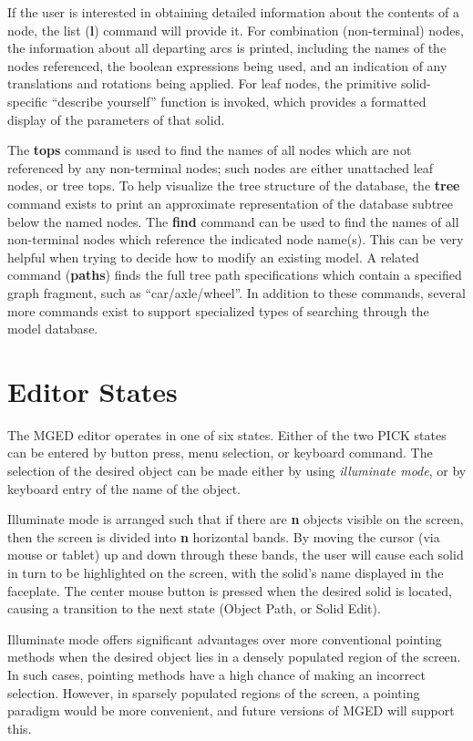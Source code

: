 If the user is interested in obtaining detailed information about the
contents of a node, the list ({\bf l}) command will provide it.
For combination (non-terminal) nodes, the information about all departing
arcs is printed, including the names of the nodes referenced, the boolean
expressions being used, and an indication of any translations and rotations
being applied.
For leaf nodes, the primitive solid-specific ``describe yourself''
function is invoked, which provides a formatted display of the parameters
of that solid.

The {\bf tops} command is used to find the names of all nodes which are
not referenced by any non-terminal nodes;  such nodes are either
unattached leaf nodes, or tree tops.
To help visualize the tree structure of the database,
the {\bf tree} command exists to
print an approximate representation of the database subtree below the
named nodes.
The {\bf find} command can be used to find the names of all non-terminal
nodes which reference the indicated node name(s).  This can be very helpful
when trying to decide how to modify an existing model.
A related command ({\bf paths}) finds the full tree path specifications
which contain a specified graph fragment, such as ``car/axle/wheel''.
In addition to these commands, several more commands exist
to support specialized types of searching through the model database.

\section{Editor States}

The MGED editor operates in one of six states.
Either of the two PICK states can be entered by button press,
menu selection, or keyboard command.  The selection of the desired
object can be made either by using {\em illuminate mode}, or by
keyboard entry of the name of the object.

Illuminate mode is arranged such that if there are {\bf n} objects visible on
the screen, then the screen is divided into {\bf n} horizontal bands.
By moving the cursor (via mouse or tablet) up and down through these bands,
the user will cause each solid in turn to be highlighted on the screen,
with the solid's name displayed in the faceplate.
The center mouse button is pressed when the desired solid is located, causing
a transition to the next state (Object Path, or Solid Edit).

Illuminate mode offers significant advantages over more conventional pointing
methods when the desired object lies in a densely populated region of the
screen.  In such cases, pointing methods have a high chance of making an
incorrect selection.
However, in sparsely populated regions of the screen, a pointing paradigm
would be more convenient, and future versions of MGED will support this.

